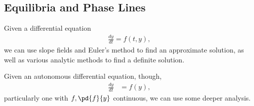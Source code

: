 \documentclass[10pt]{mypackage}
\begin{document}
\subsection{Equilibria and Phase Lines}%
Given a differential equation
\begin{align*}
  \frac{dy}{dt} = f(t,y),
\end{align*}
we can use slope fields and Euler's method to find an approximate solution, as well as various analytic methods to find a definite solution.\newline

Given an autonomous differential equation, though,
\begin{align*}
  \frac{dy}{dt} &= f(y),
\end{align*}
particularly one with $f,\pd{f}{y}$ continuous, we can use some deeper analysis.\newline
\end{document}
